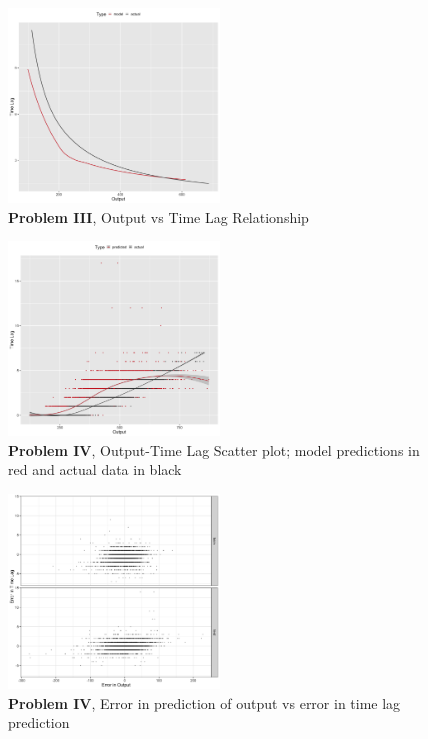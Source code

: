 \documentclass[twoside]{article}
\begin{document}
\begin{figure}[h]
\vspace{.3in}
\centerline{\includegraphics[width=0.5\textwidth]{figures/exp3_predictive_curves.png}}
\vspace{.3in}
\caption{\textbf{Problem III}, Output vs Time Lag Relationship}
\label{fig:problem3_curves}
\end{figure}


\begin{figure}[h]
\vspace{.3in}
\centerline{\includegraphics[width=0.5\textwidth]{figures/exp4_scatter_v_tl.png}}
\vspace{.3in}
\caption{\textbf{Problem IV}, Output-Time Lag Scatter plot; model predictions in red and actual data in black}
\label{fig:problem4_scatter}
\end{figure}

\begin{figure}[h]
\vspace{.3in}
\centerline{\includegraphics[width=0.5\textwidth]{figures/exp4_scatter_errors_test.png}}
\vspace{.3in}
\caption{\textbf{Problem IV}, Error in prediction of output vs error in time lag prediction}
\label{fig:problem4_error}
\end{figure}
\end{document}
